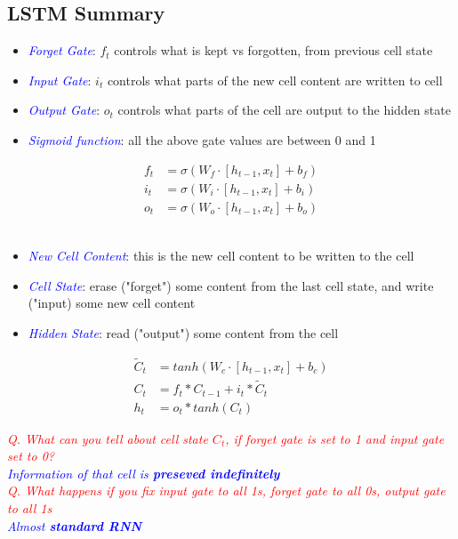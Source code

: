 \documentclass{article}
\begin{document}
\subsection{LSTM Summary}
\begin{itemize}
    \item \textcolor{blue}{\textit{Forget Gate}}: $f_t$ controls what is kept vs forgotten, from previous cell state
    \item \textcolor{blue}{\textit{Input Gate}}: $i_t$ controls what parts of the new cell content are written to cell
    \item \textcolor{blue}{\textit{Output Gate}}: $o_t$ controls what parts of the cell are output to the hidden state
    \item \textcolor{blue}{\textit{ Sigmoid function}}: all the above gate values are between 0 and 1
\end{itemize}

\begin{align*}
    f_t &= \sigma(W_f \cdot [h_{t-1},x_t] + b_f)\\
    i_t &= \sigma(W_i \cdot [h_{t-1}, x_t] + b_i) \\
    o_t &= \sigma(W_o \cdot [h_{t-1}, x_t] + b_o)
\end{align*} \\

\begin{itemize}
    \item \textcolor{blue}{\textit{ New Cell Content}}: this is the new cell content to be written to the cell
    \item \textcolor{blue}{\textit{ Cell State}}: erase ("forget") some content from the last cell state, and write ("input) some new cell content
    \item \textcolor{blue}{\textit{ Hidden State}}: read ("output") some content from the cell 
\end{itemize}
\begin{align*}
    \tilde{C}_t &= tanh(W_c \cdot [h_{t-1}, x_t] +b_c )\\
    C_t &= f_t \ast C_{t-1} + i_t \ast \tilde{C}_t \\
    h_t &= o_t \ast tanh(C_t)
\end{align*}

\textcolor{red}{\textit{Q. What can you tell about cell state $C_t$, if forget gate is set to 1 and input gate set to 0?}}\\
\textcolor{blue}{\textit{Information of that cell is \textbf{preseved indefinitely}}}\\
\textcolor{red}{\textit{Q. What happens if you fix input gate to all 1s, forget gate to all 0s, output gate to all 1s}}\\
\textcolor{blue}{\textit{Almost \textbf{standard RNN}}}\\
\end{document}
